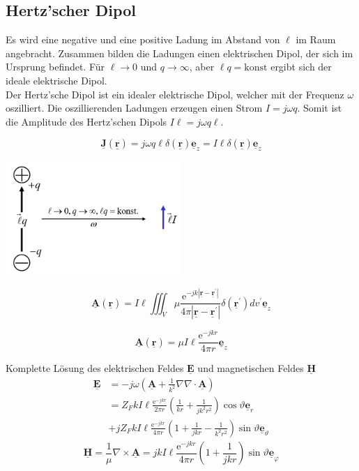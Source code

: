 \documentclass[english]{latex4ei/latex4ei_sheet}
\renewcommand{\vec}[1]{\underline{\boldsymbol{#1}}}
\begin{document}
\begin{sectionbox}
    \subsection{Hertz'scher Dipol}
    Es wird eine negative und eine positive Ladung im Abstand von $\ell$
    im Raum angebracht. Zusammen bilden die Ladungen einen elektrischen Dipol, der sich im Ursprung befindet. Für $\ell \to 0$ und $q \to \infty$, aber $\ell q = \text{konst}$ ergibt sich der ideale elektrische Dipol.\\
    Der Hertz'sche Dipol ist ein idealer elektrische Dipol, welcher mit der Frequenz $\omega$ oszilliert.
    Die oszillierenden Ladungen erzeugen einen Strom $I=j\omega q$. Somit ist die Amplitude des  Hertz'schen Dipols $I\ell = j\omega q \ell$.

    $$
        \vec{J}(\vec{r})=j \omega q \ell \delta(\vec{r}) \vec{e}_{z}=I \ell \delta(\vec{r}) \vec{e}_{z}
    $$
    \begin{center}
        \includegraphics[width=0.5\textwidth]{./img/antennen_fritz_gerald.png}
    \end{center}
    $$
        \vec{A}(\vec{r})=I \ell \iiint_{V} \mu \frac{\mathrm{e}^{-j k\left|\vec{r}-\vec{r}^{\prime}\right|}}{4 \pi\left|\vec{r}-\vec{r}^{\prime}\right|} \delta\left(\vec{r}^{\prime}\right) d v^{\prime} \vec{e}_{z}
    $$
    \begin{emphbox}
        $$
            \vec{A}(\vec{r})=\mu I \ell \frac{\mathrm{e}^{-j k r}}{4 \pi r} \vec{e}_{z}
        $$
    \end{emphbox}
    Komplette Lösung des elektrischen Feldes $\vec{E}$ und magnetischen Feldes $\vec{H}$
    $$
        \begin{aligned}
            \vec{E} & =-j \omega\left(\vec{A}+\frac{1}{k^{2}} \nabla \nabla \cdot \vec{A}\right)                                                                   \\
                    & =Z_{F} k I \ell \frac{\mathrm{e}^{-j k r}}{2 \pi r}\left(\frac{1}{k r}+\frac{1}{j k^{2} r^{2}}\right) \cos \vartheta \vec{e}_{r}             \\
                    & +j Z_{F} k I \ell \frac{\mathrm{e}^{-j k r}}{4 \pi r}\left(1+\frac{1}{j k r}-\frac{1}{k^{2} r^{2}}\right) \sin \vartheta \vec{e}_{\vartheta}
        \end{aligned}
    $$
    $$
        \vec{H}=\frac{1}{\mu} \nabla \times \vec{A}=j k I \ell \frac{\mathrm{e}^{-j k r}}{4 \pi r}\left(1+\frac{1}{j k r}\right) \sin \vartheta \vec{e}_{\varphi}
    $$
\end{sectionbox}
\end{document}

